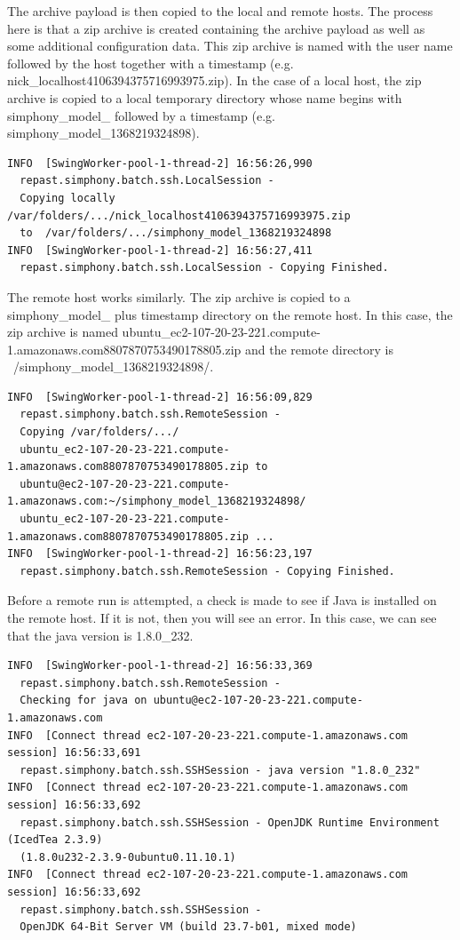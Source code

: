 \documentclass[11pt]{amsart}
\begin{document}
The archive payload is then copied to the local and remote hosts. The process here is that a zip archive is created containing the archive payload as well as some additional configuration data. This zip archive is named with the user name followed by the host together with a timestamp (e.g. nick\_localhost4106394375716993975.zip). In the case of a local host, the zip archive is copied to a local temporary directory whose name begins with simphony\_model\_ followed by a timestamp (e.g. simphony\_model\_1368219324898).

\begin{verbatim}
INFO  [SwingWorker-pool-1-thread-2] 16:56:26,990
  repast.simphony.batch.ssh.LocalSession -
  Copying locally /var/folders/.../nick_localhost4106394375716993975.zip
  to  /var/folders/.../simphony_model_1368219324898
INFO  [SwingWorker-pool-1-thread-2] 16:56:27,411
  repast.simphony.batch.ssh.LocalSession - Copying Finished.
\end{verbatim}

The remote host works similarly. The zip archive is copied to a simphony\_model\_ plus timestamp directory on the remote host. In this case, the zip archive is named  ubuntu\_ec2-107-20-23-221.compute-1.amazonaws.com8807870753490178805.zip and the remote directory is ~/simphony\_model\_1368219324898/.

\begin{verbatim}
INFO  [SwingWorker-pool-1-thread-2] 16:56:09,829
  repast.simphony.batch.ssh.RemoteSession -
  Copying /var/folders/.../
  ubuntu_ec2-107-20-23-221.compute-1.amazonaws.com8807870753490178805.zip to
  ubuntu@ec2-107-20-23-221.compute-1.amazonaws.com:~/simphony_model_1368219324898/
  ubuntu_ec2-107-20-23-221.compute-1.amazonaws.com8807870753490178805.zip ...
INFO  [SwingWorker-pool-1-thread-2] 16:56:23,197
  repast.simphony.batch.ssh.RemoteSession - Copying Finished.
\end{verbatim}

Before a remote run is attempted, a check is made to see if Java is installed on the remote host. If it is not, then you will see an error. In this case, we can see that the java version is 1.8.0\_232.

\begin{verbatim}
INFO  [SwingWorker-pool-1-thread-2] 16:56:33,369
  repast.simphony.batch.ssh.RemoteSession -
  Checking for java on ubuntu@ec2-107-20-23-221.compute-1.amazonaws.com
INFO  [Connect thread ec2-107-20-23-221.compute-1.amazonaws.com session] 16:56:33,691
  repast.simphony.batch.ssh.SSHSession - java version "1.8.0_232"
INFO  [Connect thread ec2-107-20-23-221.compute-1.amazonaws.com session] 16:56:33,692
  repast.simphony.batch.ssh.SSHSession - OpenJDK Runtime Environment (IcedTea 2.3.9)
  (1.8.0u232-2.3.9-0ubuntu0.11.10.1)
INFO  [Connect thread ec2-107-20-23-221.compute-1.amazonaws.com session] 16:56:33,692
  repast.simphony.batch.ssh.SSHSession -
  OpenJDK 64-Bit Server VM (build 23.7-b01, mixed mode)
\end{verbatim}
\end{document}
